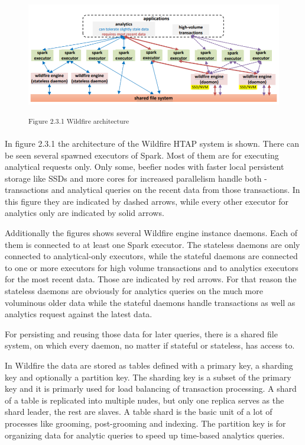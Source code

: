\begin{figure}[h]
\centering
\includegraphics[width=\textwidth]{images/wildfire_architecture.png}

\textsuperscript{Figure 2.3.1 Wildfire architecture}
\end{figure}

In figure 2.3.1 the architecture of the Wildfire HTAP system is shown. There can be seen several spawned executors of Spark. Most of them are for executing analytical requests only. Only some, beefier nodes with faster local persistent storage like SSDs and more cores for increased parallelism handle both - transactions and analytical queries on the recent data from those transactions. In this figure they are indicated by dashed arrows, while every other executor for analytics only are indicated by solid arrows.

Additionally the figures shows several Wildfire engine instance daemons. Each of them is connected to at least one Spark executor. The stateless daemons are only connected to analytical-only executors, while the stateful daemons are connected to one or more executors for high volume transactions and to analytics executors for the most recent data. Those are indicated by red arrows. For that reason the stateless daemons are obviously for analytics queries on the much more voluminous older data while the stateful daemons handle transactions as well as analytics request against the latest data.

For persisting and reusing those data for later queries, there is a shared file system, on which every daemon, no matter if stateful or stateless, has access to.%


In Wildfire the data are stored as tables defined with a primary key, a sharding key and optionally a partition key. The sharding key is a subset of the primary key and it is primarly used for load balancing of transaction processing. A shard of a table is replicated into multiple nudes, but only one replica serves as the shard leader, the rest are slaves. A table shard is the basic unit of a lot of processes like grooming, post-grooming and indexing. The partition key is for organizing data for analytic queries to speed up time-based analytics queries.

